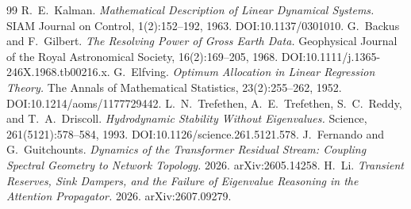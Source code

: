\documentclass[11pt]{article}
\theoremstyle{definition}
\theoremstyle{remark}
\begin{document}
\begin{thebibliography}{99}
R.~E.~Kalman. \emph{Mathematical Description of Linear Dynamical Systems.}
SIAM Journal on Control, 1(2):152--192, 1963. DOI:10.1137/0301010.
G.~Backus and F.~Gilbert. \emph{The Resolving Power of Gross Earth Data.}
Geophysical Journal of the Royal Astronomical Society, 16(2):169--205, 1968.
DOI:10.1111/j.1365-246X.1968.tb00216.x.
G.~Elfving. \emph{Optimum Allocation in Linear Regression Theory.} The
Annals of Mathematical Statistics, 23(2):255--262, 1952.
DOI:10.1214/aoms/1177729442.
L.~N.~Trefethen, A.~E.~Trefethen, S.~C.~Reddy, and T.~A.~Driscoll.
\emph{Hydrodynamic Stability Without Eigenvalues.} Science, 261(5121):578--584,
1993. DOI:10.1126/science.261.5121.578.
J.~Fernando and G.~Guitchounts. \emph{Dynamics of the Transformer Residual
Stream: Coupling Spectral Geometry to Network Topology.} 2026.
arXiv:2605.14258.
H.~Li. \emph{Transient Reserves, Sink Dampers, and the Failure of Eigenvalue
Reasoning in the Attention Propagator.} 2026. arXiv:2607.09279.
\end{thebibliography}

\bigskip
\noindent{}
\end{document}
